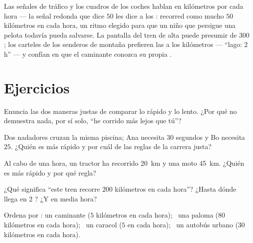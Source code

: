 \begin{example}\label{ex:g5:speed-distance-time:signs}
Las señales de tráfico y los cuadros de los coches hablan en
kilómetros por cada hora --- la señal redonda que dice $50$ les dice a
los : recorred como mucho $50$ kilómetros en cada hora, un
ritmo elegido para que un niño que persigue una pelota todavía pueda
salvarse. La pantalla del tren de alta  puede presumir de
$300$; los carteles de los senderos de montaña prefieren las
 a los kilómetros --- ``lago: 2 h'' --- y confían en que el
caminante conozca su propia .
\end{example}

\section{Ejercicios}

\begin{exercise}[$\star$]\label{exo:g5:speed-distance-time:1}
Enuncia las dos maneras justas de comparar lo rápido y lo lento. ¿Por
qué no demuestra nada, por sí solo, ``he corrido más lejos que tú''?
\end{exercise}

\begin{exercise}[$\star$]\label{exo:g5:speed-distance-time:2}
Dos nadadores cruzan la misma piscina; Ana necesita $30$ segundos y Bo
necesita $25$. ¿Quién es más rápido y por cuál de las reglas de la
carrera justa?
\end{exercise}

\begin{exercise}[$\star$]\label{exo:g5:speed-distance-time:3}
Al cabo de una hora, un tractor ha recorrido \qty{20}{km} y una moto
\qty{45}{km}. ¿Quién es más rápido y por qué regla?
\end{exercise}

\begin{exercise}[$\star$]\label{exo:g5:speed-distance-time:4}
¿Qué significa ``este tren recorre $200$ kilómetros en cada hora''?
¿Hasta dónde llega en $2$ ? ¿Y en media hora?
\end{exercise}

\begin{exercise}[$\star$]\label{exo:g5:speed-distance-time:5}
Ordena por : un caminante ($5$ kilómetros en cada hora); \
una paloma ($80$ kilómetros en cada hora); \ un caracol ($5$
\emph{} en cada hora); \ un autobús urbano ($30$ kilómetros en
cada hora).
\end{exercise}

